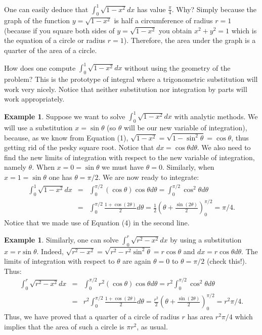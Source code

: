 \documentclass[12pt]{article}
\theoremstyle{definition}
\newtheorem{exa}[thm]{Example}
\begin{document}
One can easily deduce that $\int_0^1 \sqrt{1-x^2}dx$ has value
$\frac{\pi}{4}$. Why? Simply because the graph of the function
$y=\sqrt{1-x^2}$ is half a circumference of radius $r=1$ (because
if you square both sides of $y=\sqrt{1-x^2}$ you obtain
$x^2+y^2=1$ which is the equation of a circle or radius $r=1$).
Therefore, the area under the graph is a quarter of the area of a
circle.

How does one compute $\int_0^1 \sqrt{1-x^2} dx$ without using the
geometry of the problem? This is the prototype of integral where a
trigonometric substitution will work very nicely. Notice that
neither substitution nor integration by parts will work
appropriately.

\begin{exa}
Suppose we want to solve $\int_0^1 \sqrt{1-x^2}dx$ with analytic
methods. We will use a substitution $x=\sin \theta$ (so $\theta$
will be our new variable of integration), because, as we know from
Equation (1), $\sqrt{1-x^2}=\sqrt{1-\sin^2 \theta}=\cos \theta$,
thus getting rid of the pesky square root. Notice that
$dx=\cos\theta d\theta$. We also need to find the new limits of
integration with respect to the new variable of integration,
namely $\theta$. When $x=0=\sin\theta$ we must have $\theta=0$.
Similarly, when $x=1=\sin\theta$ one has $\theta=\pi/2$. We are
now ready to integrate:
\begin{eqnarray*}
\int_0^1 \sqrt{1-x^2}dx &=& \int_0^{\pi/2} (\cos \theta)\cos
\theta
d\theta=\int_0^{\pi/2} \cos^2 \theta d\theta\\
&=& \int_0^{\pi/2} \frac{1+\cos(2\theta)}{2}d\theta =
\frac{1}{2}\left(\theta+\frac{\sin(2\theta)}{2}\right)_0^{\pi/2}=\pi/4.
\end{eqnarray*}
Notice that we made use of Equation (4) in the second line.
\end{exa}
\begin{exa}
Similarly, one can solve $\int_0^r\sqrt{r^2 - x^2}dx$ by using a
substitution $x=r\sin\theta$. Indeed,
$\sqrt{r^2-x^2}=\sqrt{r^2-r^2\sin^2 \theta}=r\cos \theta$ and
$dx=r\cos\theta d\theta$. The limits of integration with respect
to $\theta$ are again $\theta=0$ to $\theta=\pi/2$ (check this!).
Thus:
\begin{eqnarray*}
\int_0^r \sqrt{r^2-x^2}dx &=& \int_0^{\pi/2} r^2(\cos \theta)\cos
\theta
d\theta=r^2\int_0^{\pi/2} \cos^2 \theta d\theta\\
&=& r^2\int_0^{\pi/2} \frac{1+\cos(2\theta)}{2}d\theta =
\frac{r^2}{2}\left(\theta+\frac{\sin(2\theta)}{2}\right)_0^{\pi/2}=r^2\pi/4.
\end{eqnarray*}
Thus, we have proved that a quarter of a circle of radius $r$ has
area $r^2\pi/4$ which implies that the area of such a circle is
$\pi r^2$, as usual.
\end{exa}
\end{document}
